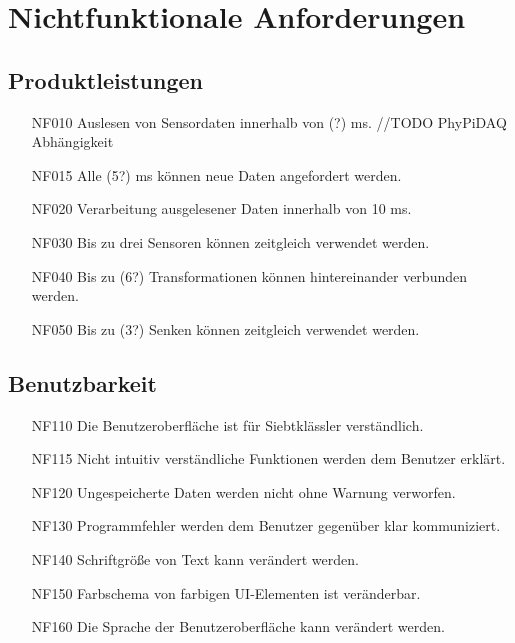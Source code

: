 \documentclass[parskip=full]{scrartcl}
\begin{document}
\section{Nichtfunktionale Anforderungen}

\subsection{Produktleistungen}

\begin{itemize}

\item[NF010] Auslesen von Sensordaten innerhalb von (?) ms. //TODO PhyPiDAQ Abhängigkeit
\item[NF015] Alle (5?) ms können neue Daten angefordert werden.
\item[NF020] Verarbeitung ausgelesener Daten innerhalb von 10 ms.
\item[NF030] Bis zu drei Sensoren können zeitgleich verwendet werden.
\item[NF040] Bis zu (6?) Transformationen können hintereinander verbunden werden.
\item[NF050] Bis zu (3?) Senken können zeitgleich verwendet werden.

\end{itemize}

\subsection{Benutzbarkeit}

\begin{itemize}

\item[NF110] Die Benutzeroberfläche ist für Siebtklässler verständlich.
\item[NF115] Nicht intuitiv verständliche Funktionen werden dem Benutzer erklärt.
\item[NF120] Ungespeicherte Daten werden nicht ohne Warnung verworfen.
\item[NF130] Programmfehler werden dem Benutzer gegenüber klar kommuniziert.
\item[NF140] Schriftgröße von Text kann verändert werden.
\item[NF150] Farbschema von farbigen UI-Elementen ist veränderbar.
\item[NF160] Die Sprache der Benutzeroberfläche kann verändert werden.

\end{itemize}
\end{document}
